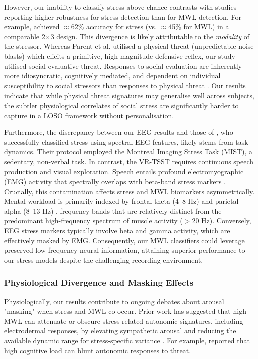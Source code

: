 \documentclass[lettersize,journal]{IEEEtran}
\begin{document}
However, our inability to classify stress above chance contrasts with studies reporting higher robustness for stress detection than for MWL detection. For example, \cite{parentDiagnosticityPsychophysiologicalSignatures2019} achieved $\approx$62\% accuracy for stress (vs. $\approx$45\% for MWL) in a comparable 2$\times$3 design. This divergence is likely attributable to the \textit{modality} of the stressor. Whereas Parent et al. utilised a physical threat (unpredictable noise blasts) which elicits a primitive, high-magnitude defensive reflex, our study utilised social-evaluative threat. Responses to social evaluation are inherently more idiosyncratic, cognitively mediated, and dependent on individual susceptibility to social stressors than responses to physical threat \cite{campbell-sillsPsychometricPropertiesSubjective2006}. Our results indicate that while physical threat signatures may generalise well across subjects, the subtler physiological correlates of social stress are significantly harder to capture in a LOSO framework without personalisation.

Furthermore, the discrepancy between our EEG results and those of \cite{bagheriSimultaneousClassificationBoth2022}, who successfully classified stress using spectral EEG features, likely stems from task dynamics. Their protocol employed the Montreal Imaging Stress Task (MIST), a sedentary, non-verbal task. In contrast, the VR-TSST requires continuous speech production and visual exploration. Speech entails profound electromyographic (EMG) activity that spectrally overlaps with beta-band stress markers \cite{goncharovaEMGContaminationEEG2003}. Crucially, this contamination affects stress and MWL biomarkers asymmetrically. Mental workload is primarily indexed by frontal theta (4--8 Hz) and parietal alpha (8--13 Hz) \cite{EEGbasedWorkloadEstimation}, frequency bands that are relatively distinct from the predominant high-frequency spectrum of muscle activity ($>$20 Hz). Conversely, EEG stress markers typically involve beta and gamma activity, which are effectively masked by EMG. Consequently, our MWL classifiers could leverage preserved low-frequency neural information, attaining superior performance to our stress models despite the challenging recording environment.

\subsubsection{Physiological Divergence and Masking Effects}
Physiologically, our results contribute to ongoing debates about arousal "masking" when stress and MWL co-occur. Prior work has suggested that high MWL can attenuate or obscure stress-related autonomic signatures, including electrodermal responses, by elevating sympathetic arousal and reducing the available dynamic range for stress-specific variance \cite{conwayEffectMentalWorkload2013, setzDiscriminatingStressCognitive2010}. For example, \cite{conwayEffectStressCognitive2013} reported that high cognitive load can blunt autonomic responses to threat.
\end{document}

